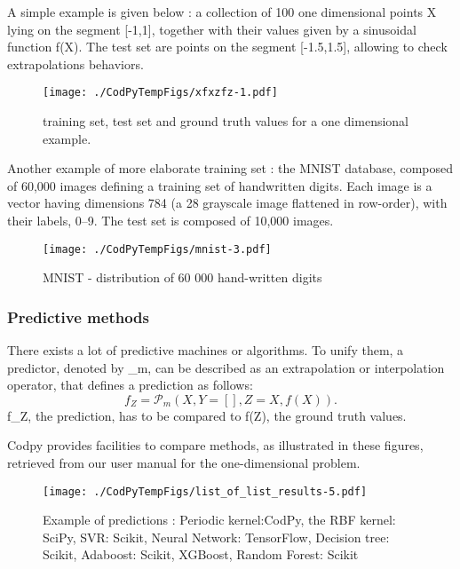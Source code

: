 \documentclass[
]{article}
\def\({}%
\def\){}%
\numberwithin{equation}{section}
\begin{document}
A simple example is given below : a collection of 100 one dimensional
points \(X\) lying on the segment {[}-1,1{]}, together with their values
given by a sinusoidal function \(f(X)\). The test set are points on the
segment {[}-1.5,1.5{]}, allowing to check extrapolations behaviors.

\begin{figure}
\centering
\texttt{[image: ./CodPyTempFigs/xfxzfz-1.pdf]}
\caption{training set, test set and ground truth values for a one
dimensional example.}
\end{figure}

Another example of more elaborate training set : the MNIST database,
composed of \(60,000\) images defining a training set of handwritten
digits. Each image is a vector having dimensions \(784\) (a
\(28 \) grayscale image flattened in row-order), with their
labels, \(0–9\). The test set is composed of \(10,000\) images.

\begin{figure}
\centering
\texttt{[image: ./CodPyTempFigs/mnist-3.pdf]}
\caption{\label{mnist} MNIST - distribution of 60 000 hand-written
digits}
\end{figure}

\newpage

\hypertarget{predictive-methods-1}{%
\subsubsection{Predictive methods}\label{predictive-methods-1}}

There exists a lot of predictive machines or algorithms. To unify them,
a predictor, denoted by \(_m\), can be described as an
extrapolation or interpolation operator, that defines a prediction as
follows: \begin{equation}\label{eq:Pm}
f_Z = \mathcal{P}_{m}(X,Y=[],Z=X,f(X)).
\end{equation} \(f_Z\), the prediction, has to be compared to \(f(Z)\),
the ground truth values.

Codpy provides facilities to compare methods, as illustrated in these
figures, retrieved from our user manual for the one-dimensional problem.

\begin{figure}
\centering
\texttt{[image: ./CodPyTempFigs/list\_of\_list\_results-5.pdf]}
\caption{Example of predictions : Periodic kernel:CodPy, the RBF kernel:
SciPy, SVR: Scikit, Neural Network: TensorFlow, Decision tree: Scikit,
Adaboost: Scikit, XGBoost, Random Forest: Scikit}
\end{figure}
\end{document}
